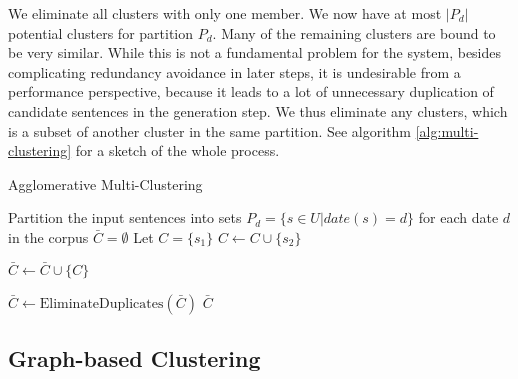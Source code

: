 \documentclass[a4paper,BCOR=10mm]{report}
\begin{document}
We eliminate all clusters with only one member. We now have at most $|P_d|$ potential clusters for partition $P_d$.
Many of the remaining clusters are bound to be very similar. While this is not a fundamental problem for the system, besides complicating redundancy avoidance in later steps, it is undesirable from a performance perspective, because it leads to a lot of unnecessary duplication of candidate sentences in the generation step.
We thus eliminate any clusters, which is a subset of another cluster in the same partition. See algorithm \ref{alg:multi-clustering} for a sketch of the whole process.


 \begin{algorithm}
 \caption{Agglomerative Multi-Clustering}
 \label{alg:multi-clustering}
 \begin{algorithmic}
    \STATE Partition the input sentences into sets $P_d = \{ s \in U | date(s) = d \}$ for each date $d$ in the corpus
    \STATE $\bar{C} = \emptyset$
            \STATE Let $C = \{  s_1 \}$
                    \STATE $C \leftarrow C \cup \{ s_2 \}$
                \ENDIF
            \ENDFOR

                \STATE $\bar{C} \leftarrow \bar{C} \cup \{ C \}$
            \ENDIF
        \ENDFOR

    \ENDFOR
    \STATE $\bar{C} \leftarrow \text{EliminateDuplicates}(\bar{C})$
    \RETURN $\bar{C}$

\end{algorithmic}
\end{algorithm}

\subsection{Graph-based Clustering}
\end{document}
